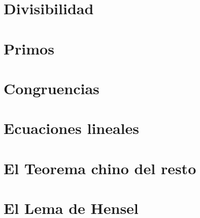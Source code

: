 \section{Divisibilidad}\label{sec:divisibilidad}


\section{Primos}\label{sec:primos}


\section{Congruencias}\label{sec:congruencias}


\section{Ecuaciones lineales}\label{sec:lineales}


\section{El Teorema chino del resto}\label{sec:chino}


\section{El Lema de Hensel}\label{sec:hensel}


